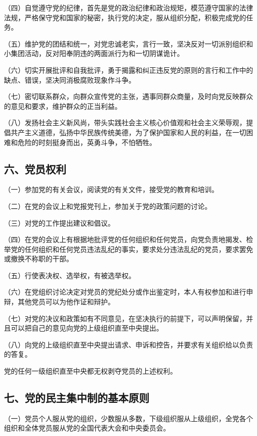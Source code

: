 \documentclass[UTF8,11pt,a4paper]{ctexart}
\begin{document}
\noindent （四）自觉遵守党的纪律，首先是党的政治纪律和政治规矩，模范遵守国家的法律法规，严格保守党和国家的秘密，执行党的决定，服从组织分配，积极完成党的任务。

\noindent （五）维护党的团结和统一，对党忠诚老实，言行一致，坚决反对一切派别组织和小集团活动，反对阳奉阴违的两面派行为和一切阴谋诡计。

\noindent （六）切实开展批评和自我批评，勇于揭露和纠正违反党的原则的言行和工作中的缺点、错误，坚决同消极腐败现象作斗争。

\noindent （七）密切联系群众，向群众宣传党的主张，遇事同群众商量，及时向党反映群众的意见和要求，维护群众的正当利益。

\noindent （八）发扬社会主义新风尚，带头实践社会主义核心价值观和社会主义荣辱观，提倡共产主义道德，弘扬中华民族传统美德，为了保护国家和人民的利益，在一切困难和危险的时刻挺身而出，英勇斗争，不怕牺牲。

\subsection*{六、党员权利}

\noindent （一）参加党的有关会议，阅读党的有关文件，接受党的教育和培训。

\noindent （二）在党的会议上和党报党刊上，参加关于党的政策问题的讨论。

\noindent （三）对党的工作提出建议和倡议。

\noindent （四）在党的会议上有根据地批评党的任何组织和任何党员，向党负责地揭发、检举党的任何组织和任何党员违法乱纪的事实，要求处分违法乱纪的党员，要求罢免或撤换不称职的干部。

\noindent （五）行使表决权、选举权，有被选举权。

\noindent （六）在党组织讨论决定对党员的党纪处分或作出鉴定时，本人有权参加和进行申辩，其他党员可以为他作证和辩护。

\noindent （七）对党的决议和政策如有不同意见，在坚决执行的前提下，可以声明保留，并且可以把自己的意见向党的上级组织直至中央提出。

\noindent （八）向党的上级组织直至中央提出请求、申诉和控告，并要求有关组织给以负责的答复。

党的任何一级组织直至中央都无权剥夺党员的上述权利。

\subsection*{七、党的民主集中制的基本原则}

\noindent （一）党员个人服从党的组织，少数服从多数，下级组织服从上级组织，全党各个组织和全体党员服从党的全国代表大会和中央委员会。
\end{document}
